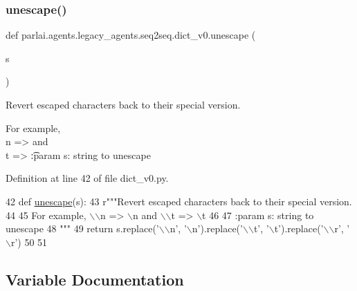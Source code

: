 \subsubsection{\texorpdfstring{unescape()}{unescape()}}
{\footnotesize\ttfamily def parlai.\+agents.\+legacy\+\_\+agents.\+seq2seq.\+dict\+\_\+v0.\+unescape (\begin{DoxyParamCaption}\item[{}]{s }\end{DoxyParamCaption})}

\begin{DoxyVerb}Revert escaped characters back to their special version.

For example, \\n => \n and \\t => \t

:param s: string to unescape
\end{DoxyVerb}
 

Definition at line 42 of file dict\+\_\+v0.\+py.


\begin{DoxyCode}
42 \textcolor{keyword}{def }\hyperlink{namespaceparlai_1_1agents_1_1legacy__agents_1_1seq2seq_1_1dict__v0_a1803c89a6cc7d5323a31a1f7e79728ed}{unescape}(s):
43     \textcolor{stringliteral}{r"""Revert escaped characters back to their special version.}
44 \textcolor{stringliteral}{}
45 \textcolor{stringliteral}{    For example, \(\backslash\)\(\backslash\)n => \(\backslash\)n and \(\backslash\)\(\backslash\)t => \(\backslash\)t}
46 \textcolor{stringliteral}{}
47 \textcolor{stringliteral}{    :param s: string to unescape}
48 \textcolor{stringliteral}{    """}
49     \textcolor{keywordflow}{return} s.replace(\textcolor{stringliteral}{'\(\backslash\)\(\backslash\)n'}, \textcolor{stringliteral}{'\(\backslash\)n'}).replace(\textcolor{stringliteral}{'\(\backslash\)\(\backslash\)t'}, \textcolor{stringliteral}{'\(\backslash\)t'}).replace(\textcolor{stringliteral}{'\(\backslash\)\(\backslash\)r', '}\(\backslash\)r')
50 
51 
\end{DoxyCode}


\subsection{Variable Documentation}
\mbox{\label{namespaceparlai_1_1agents_1_1legacy__agents_1_1seq2seq_1_1dict__v0_a01540308d06a36d0c40cf060811f866b}} 
